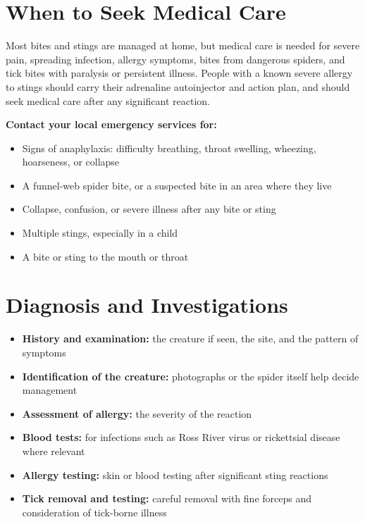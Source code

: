 \section*{When to Seek Medical Care}
Most bites and stings are managed at home, but medical care is needed for severe pain, spreading infection, allergy symptoms, bites from dangerous spiders, and tick bites with paralysis or persistent illness. People with a known severe allergy to stings should carry their adrenaline autoinjector and action plan, and should seek medical care after any significant reaction.

\textbf{Contact your local emergency services for:}
\begin{itemize}
    \item Signs of anaphylaxis: difficulty breathing, throat swelling, wheezing, hoarseness, or collapse
    \item A funnel-web spider bite, or a suspected bite in an area where they live
    \item Collapse, confusion, or severe illness after any bite or sting
    \item Multiple stings, especially in a child
    \item A bite or sting to the mouth or throat
\end{itemize}

\section*{Diagnosis and Investigations}
\begin{itemize}
    \item \textbf{History and examination:} the creature if seen, the site, and the pattern of symptoms
    \item \textbf{Identification of the creature:} photographs or the spider itself help decide management
    \item \textbf{Assessment of allergy:} the severity of the reaction
    \item \textbf{Blood tests:} for infections such as Ross River virus or rickettsial disease where relevant
    \item \textbf{Allergy testing:} skin or blood testing after significant sting reactions
    \item \textbf{Tick removal and testing:} careful removal with fine forceps and consideration of tick-borne illness
\end{itemize}

